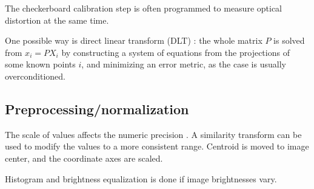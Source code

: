 The checkerboard calibration step is often programmed to measure optical distortion at the same time. \cite{opencv,camcalmatlab}



One possible way is direct linear transform (DLT) \cite{hartley03multiview}: the whole matrix $P$ is solved from $x_i = PX_i$ by constructing a system of equations from the projections of some known points $i$, and minimizing an error metric, as the case is usually overconditioned.









\subsection{Preprocessing/normalization} %

The scale of values affects the numeric precision \cite{hartley1997defense,hartley03multiview}.
A similarity transform can be used to modify the values to a more consistent range.
Centroid is moved to image center, and the coordinate axes are scaled.


Histogram and brightness equalization is done if image brightnesses vary.

